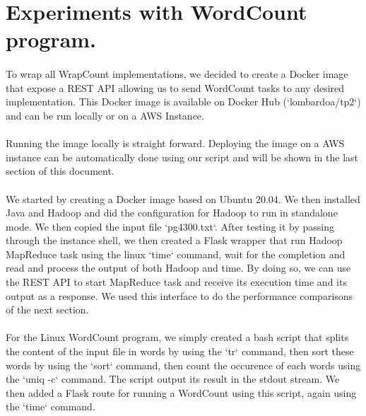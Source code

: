 \section{Experiments with WordCount program.} \label{T1}

\paragraph{}To wrap all WrapCount implementations, we decided to create a Docker image that expose a REST API allowing us to send WordCount tasks to any desired implementation. This Docker image is available on Docker Hub (`lombardoa/tp2`) and can be run locally or on a AWS Instance. 

\paragraph{}Running the image locally is straight forward. Deploying the image on a AWS instance can be automatically done using our script and will be shown in the last section of this document.

\paragraph{}We started by creating a Docker image based on Ubuntu 20.04. We then installed Java and Hadoop and did the configuration for Hadoop to run in standalone mode. We then copied the input file `pg4300.txt`. After testing it by passing through the instance shell, we then created a Flask wrapper that run Hadoop MapReduce task using the linux `time` command, wait for the completion and read and process the output of both Hadoop and time. By doing so, we can use the REST API to start MapReduce task and receive its execution time and its output as a response. We used this interface to do the performance comparisons of the next section.

\paragraph{}For the Linux WordCount program, we simply created a bash script that splits the content of the input file in words by using the `tr` command, then sort these words by using the `sort` command, then count the occurence of each words using the `uniq -c` command. The script output its result in the stdout stream. We then added a Flask route for running a WordCount using this script, again using the `time` command.

